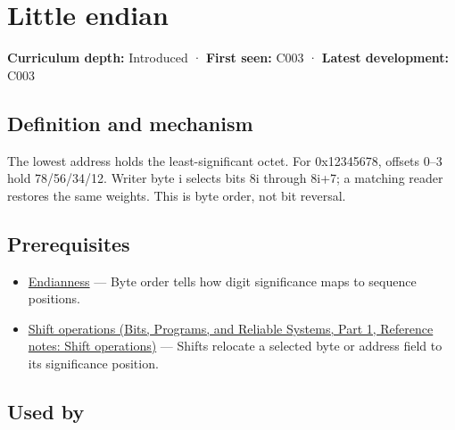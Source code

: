 \hypertarget{appendix-367b6abf460e}{}\label{referencestart:appendix-367b6abf460e}
\section{Little endian}\label{appendix-367b6abf460e-little-endian}

\hypertarget{appendix-367b6abf460e-little-endian}{}

\textbf{Curriculum depth:} Introduced · \textbf{First seen:} C003 · \textbf{Latest development:} C003

\begin{allmightroledefinition}

\subsection{Definition and mechanism}\label{appendix-367b6abf460e-definition-and-mechanism}

\hypertarget{appendix-367b6abf460e-definition-and-mechanism}{}

The lowest address holds the least-significant octet. For 0x12345678, offsets 0--3 hold 78/56/34/12. Writer byte i selects bits 8i through 8i+7; a matching reader restores the same weights. This is byte order, not bit reversal.

\end{allmightroledefinition}

\subsection{Prerequisites}\label{appendix-367b6abf460e-prerequisites}

\hypertarget{appendix-367b6abf460e-prerequisites}{}

\begin{itemize}
\tightlist
\item
  \hyperref[appendix-bc07c3d25b18]{Endianness} --- Byte order tells how digit significance maps to sequence positions.
\item
  \href{../01-Bits-Programs-and-Reliable-Systems-P01/main.pdf\#appendix-73425b25118e}{Shift operations (Bits, Programs, and Reliable Systems, Part 1, Reference notes: Shift operations)} --- Shifts relocate a selected byte or address field to its significance position.
\end{itemize}

\subsection{Used by}\label{appendix-367b6abf460e-used-by}

